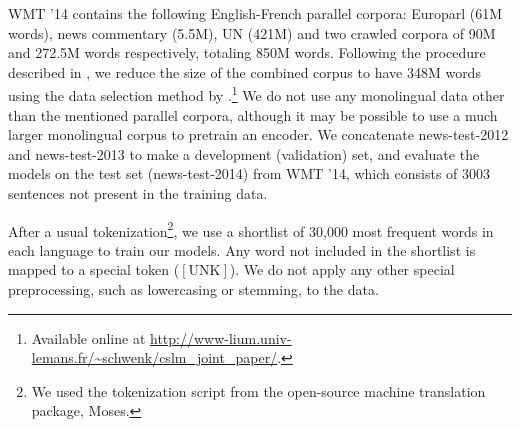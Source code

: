 \documentclass{article}
\begin{document}
WMT '14 contains the following English-French parallel corpora: Europarl (61M
words), news commentary (5.5M), UN (421M) and two crawled corpora of 90M and
272.5M words respectively, totaling 850M words. 
Following the procedure described
in \citet{Cho2014}, we reduce the size of the combined corpus to have 348M words
using the data selection method by \citet{Axelrod2011}.\footnote{
    Available online at
    \url{http://www-lium.univ-lemans.fr/~schwenk/cslm_joint_paper/}.
} We do not use any monolingual data other than the mentioned parallel corpora,
although it may be possible to use a much larger monolingual corpus to pretrain
an encoder. We concatenate news-test-2012 and news-test-2013 to make a
development (validation) set, and evaluate the models on the test set
(news-test-2014) from WMT '14, which consists of 3003 sentences not present in
the training data. 

After a usual tokenization\footnote{
    We used the tokenization script from the open-source machine translation
    package, Moses. 
}, 
we use a shortlist of 30,000 most frequent words in each language to train our
models. Any word not included in the shortlist is mapped to a special token
($\left[ \mbox{UNK} \right]$). We do not apply any other special preprocessing,
such as lowercasing or stemming, to the data.
\end{document}
